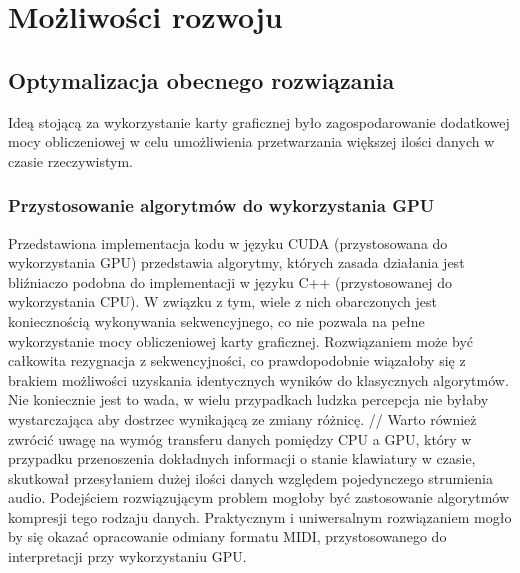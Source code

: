 \chapter{Możliwości rozwoju}

\section{Optymalizacja obecnego rozwiązania}
Ideą stojącą za wykorzystanie karty graficznej było zagospodarowanie dodatkowej mocy obliczeniowej w celu umożliwienia przetwarzania większej ilości danych w czasie rzeczywistym.

\subsection{Przystosowanie algorytmów do wykorzystania GPU}
Przedstawiona implementacja kodu w języku CUDA\cite{bib:CUDA} (przystosowana do wykorzystania GPU) przedstawia algorytmy, których zasada działania jest bliźniaczo podobna do implementacji w języku C++ (przystosowanej do wykorzystania CPU). W związku z tym, wiele z nich obarczonych jest koniecznością wykonywania sekwencyjnego, co nie pozwala na pełne wykorzystanie mocy obliczeniowej karty graficznej. Rozwiązaniem może być całkowita rezygnacja z sekwencyjności, co prawdopodobnie wiązałoby się z brakiem możliwości uzyskania identycznych wyników do klasycznych algorytmów. Nie koniecznie jest to wada, w wielu przypadkach ludzka percepcja nie byłaby wystarczająca aby dostrzec wynikającą ze zmiany różnicę. 
//
Warto również zwrócić uwagę na wymóg transferu danych pomiędzy CPU a GPU, który w przypadku przenoszenia dokładnych informacji o stanie klawiatury w czasie, skutkował przesyłaniem dużej ilości danych względem pojedynczego strumienia audio. Podejściem rozwiązującym problem mogłoby być zastosowanie algorytmów kompresji tego rodzaju danych. Praktycznym i uniwersalnym rozwiązaniem mogło by się okazać opracowanie odmiany formatu MIDI, przystosowanego do interpretacji przy wykorzystaniu GPU.

